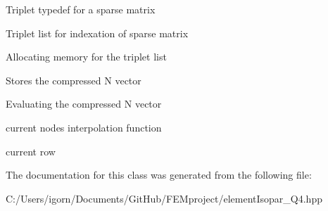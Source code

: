 Triplet typedef for a sparse matrix

Triplet list for indexation of sparse matrix

Allocating memory for the triplet list

Stores the compressed N vector

Evaluating the compressed N vector

current node\textquotesingle{}s interpolation function

current row 

The documentation for this class was generated from the following file\+:\begin{DoxyCompactItemize}
\item 
C\+:/\+Users/igorn/\+Documents/\+Git\+Hub/\+F\+E\+Mproject/element\+Isopar\+\_\+\+Q4.\+hpp\end{DoxyCompactItemize}
